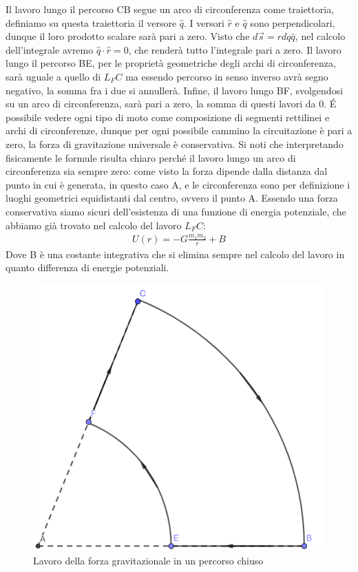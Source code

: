 \documentclass[10pt,a4paper]{article}
\begin{document}
Il lavoro lungo il percorso CB segue un arco di circonferenza come traiettoria, definiamo su questa traiettoria il versore $\hat{q}$. I versori $\hat{r}$ e $\hat{q}$ sono perpendicolari, dunque il loro prodotto scalare sarà pari a zero. Visto che $d\vec{s} = r dq \hat{q}$, nel calcolo dell'integrale avremo $\hat{q} \cdot \hat{r}= 0$, che renderà tutto l'integrale pari a zero. Il lavoro lungo il percorso BE, per le proprietà geometriche degli archi di circonferenza, sarà uguale a quello di $L_FC$ ma essendo percorso in senso inverso avrà segno negativo, la somma fra i due si annullerà. Infine, il lavoro lungo BF, svolgendosi su un arco di circonferenza, sarà pari a zero, la somma di questi lavori da 0. \'{E} possibile vedere ogni tipo di moto come composizione di segmenti rettilinei e archi di circonferenze, dunque per ogni possibile cammino la circuitazione è pari a zero, la forza di gravitazione universale è conservativa. Si noti che interpretando fisicamente le formule risulta chiaro perché il lavoro lungo un arco di circonferenza sia sempre zero: come visto la forza dipende dalla distanza dal punto in cui è generata, in questo caso A, e le circonferenza sono per definizione i luoghi geometrici equidistanti dal centro, ovvero il punto A.
Essendo una forza conservativa siamo sicuri dell'esistenza di una funzione di energia potenziale, che abbiamo già trovato nel calcolo del lavoro $L_FC$: 
\begin{align*}
	U(r) = -G\frac{m_1m_2}{r}+B
\end{align*}
Dove B è una costante integrativa che si elimina sempre nel calcolo del lavoro in quanto differenza di energie potenziali. \\
\begin{figure}[h!]
	\centering
	\includegraphics[width=0.35\linewidth]{"lavoro gravitazionale"}
	\caption{Lavoro della forza gravitazionale in un percorso chiuso}
	\label{fig:lavoro-gravitazionale}
\end{figure}\\
\newpage
\end{document}
